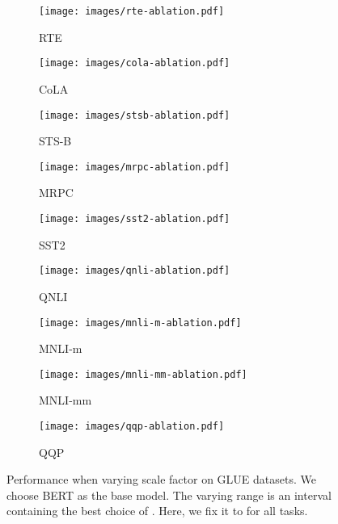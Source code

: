 \documentclass{article}
\theoremstyle{definition}
\theoremstyle{remark}
\theoremstyle{theorem}
\begin{document}
\begin{figure}[h]
     \centering
     \begin{subfigure}{0.25\textwidth}
         \centering
         \texttt{[image: images/rte-ablation.pdf]}
         \caption{RTE}
     \end{subfigure}
     \begin{subfigure}{0.25\textwidth}
         \centering
         \texttt{[image: images/cola-ablation.pdf]}
         \caption{CoLA}
     \end{subfigure}
     \begin{subfigure}{0.25\textwidth}
         \centering
         \texttt{[image: images/stsb-ablation.pdf]}
         \caption{STS-B}
     \end{subfigure}
     \hfill
     \begin{subfigure}{0.25\textwidth}
         \centering
         \texttt{[image: images/mrpc-ablation.pdf]}
         \caption{MRPC}
     \end{subfigure}
     \begin{subfigure}{0.25\textwidth}
         \centering
         \texttt{[image: images/sst2-ablation.pdf]}
         \caption{SST2}
     \end{subfigure}
     \begin{subfigure}{0.25\textwidth}
         \centering
         \texttt{[image: images/qnli-ablation.pdf]}
         \caption{QNLI}
     \end{subfigure}
     \hfill
     \begin{subfigure}{0.25\textwidth}
         \centering
         \texttt{[image: images/mnli-m-ablation.pdf]}
         \caption{MNLI-m}
     \end{subfigure}
     \begin{subfigure}{0.25\textwidth}
         \centering
         \texttt{[image: images/mnli-mm-ablation.pdf]}
         \caption{MNLI-mm}
     \end{subfigure}
     \begin{subfigure}{0.25\textwidth}
         \centering
         \texttt{[image: images/qqp-ablation.pdf]}
         \caption{QQP}
     \end{subfigure}

    \caption{Performance when varying scale factor  on GLUE datasets. We choose BERT as the base model. The varying range is an interval containing the best choice of . Here, we fix it to  for all tasks.}
    \label{fig:ablation-full}
\end{figure}
\end{document}
